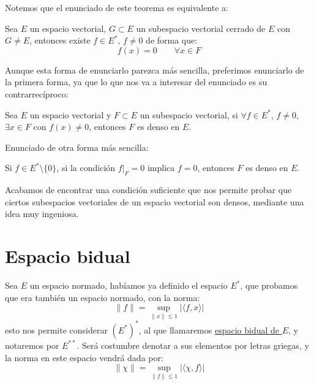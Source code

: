 \begin{observacion}
    Notemos que el enunciado de este teorema es equivalente a:
    \begin{center}
        Sea $E$ un espacio vectorial, $G\subset E$ un subespacio vectorial cerrado de $E$ con $G\neq E$, entonces existe $f\in E^\ast$, $f\neq 0$ de forma que:
        \begin{equation*}
            f(x) = 0 \qquad \forall x\in F
        \end{equation*}
    \end{center}
    Aunque esta forma de enunciarlo parezca más sencilla, preferimos enunciarlo de la primera forma, ya que lo que nos va a interesar del enunciado es su contrarrecíproco:
    \begin{center}
        Sea $E$ un espacio vectorial y $F\subset E$ un subespacio vectorial, si $\forall f\in E^\ast$, $f\neq 0$, $\exists x\in F$ con $f(x)\neq 0$, entonces $F$ es denso en $E$.
    \end{center}
    Enunciado de otra forma más sencilla:
    \begin{center}
        Si $f\in E^\ast\setminus\{0\}$, si la condición $f\big|_F=0$ implica $f=0$, entonces $F$ es denso en $E$.
    \end{center}
    Acabamos de encontrar una condición suficiente que nos permite probar que ciertos subespacios vectoriales de un espacio vectorial son densos, mediante una idea muy ingeniosa.
\end{observacion}

\section{Espacio bidual} %
\noindent
Sea $E$ un espacio normado, habíamos ya definido el espacio $E^\ast$, que probamos que era también un espacio normado, con la norma:
\begin{equation*}
    \|f\| = \sup_{\|x\|\leq 1}|\langle f,x \rangle |
\end{equation*}
esto nos permite considerar ${(E^\ast)}^{\ast}$, al que llamaremos \underline{espacio bidual de $E$}, y notaremos por $E^{\ast\ast}$. Será costumbre denotar a sus elementos por letras griegas, y la norma en este espacio vendrá dada por:
\begin{equation*}
    \|\chi\| = \sup_{\|f\|\leq 1}|\langle \chi,f \rangle |
\end{equation*}

